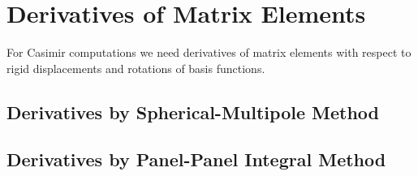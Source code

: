\documentclass[dvips,letterpaper]{article}
\begin{document}
\newpage
\section{Derivatives of Matrix Elements}

For Casimir computations we need derivatives of matrix elements
with respect to rigid displacements and rotations of basis functions.

\subsection{Derivatives by Spherical-Multipole Method}

\subsection{Derivatives by Panel-Panel Integral Method}
\end{document}
